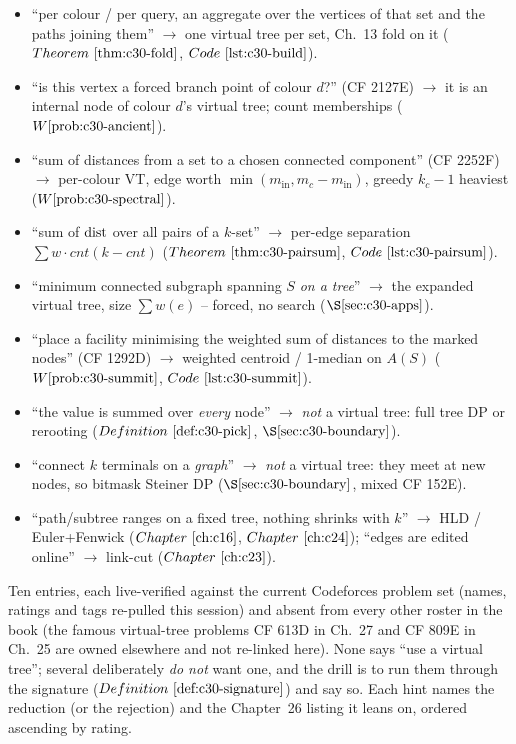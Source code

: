 \begin{itemize}[nosep, leftmargin=1.4em]
  \item ``per colour / per query, an aggregate over the vertices of that set and the paths joining them''
        \(\to\) one virtual tree per set, Ch.~13 fold on it (\(\thmref{c30-fold}\), \(\coderef{c30-build}\)).
  \item ``is this vertex a forced branch point of colour \(d\)?'' (CF 2127E) \(\to\) it is an internal node
        of colour \(d\)'s virtual tree; count memberships (\(\probref{c30-ancient}\)).
  \item ``sum of distances from a set to a chosen connected component'' (CF 2252F) \(\to\) per-colour VT,
        edge worth \(\min(m_{\text{in}},m_c-m_{\text{in}})\), greedy \(k_c-1\) heaviest (\(\probref{c30-spectral}\)).
  \item ``sum of \(\operatorname{dist}\) over all pairs of a \(k\)-set'' \(\to\) per-edge separation \(\sum w\cdot\mathit{cnt}(k-\mathit{cnt})\)
        (\(\thmref{c30-pairsum}\), \(\coderef{c30-pairsum}\)).
  \item ``minimum connected subgraph spanning \(S\) \emph{on a tree}'' \(\to\) the expanded virtual tree,
        size \(\sum\mathit{w}(e)\) -- forced, no search (\(\secref{c30-apps}\)).
  \item ``place a facility minimising the weighted sum of distances to the marked nodes'' (CF 1292D)
        \(\to\) weighted centroid / 1-median on \(A(S)\) (\(\probref{c30-summit}\), \(\coderef{c30-summit}\)).
  \item ``the value is summed over \emph{every} node'' \(\to\) \emph{not} a virtual tree: full tree DP
        or rerooting (\(\defref{c30-pick}\), \(\secref{c30-boundary}\)).
  \item ``connect \(k\) terminals on a \emph{graph}'' \(\to\) \emph{not} a virtual tree: they meet
        at new nodes, so bitmask Steiner DP (\(\secref{c30-boundary}\), mixed CF 152E).
  \item ``path/subtree ranges on a fixed tree, nothing shrinks with \(k\)'' \(\to\) HLD / Euler+Fenwick
        (\(\chref{c16}\), \(\chref{c24}\)); ``edges are edited online'' \(\to\) link-cut (\(\chref{c23}\)).
\end{itemize}


Ten entries, each live-verified against the current Codeforces problem set (names, ratings and tags
re-pulled this session) and absent from every other roster in the book (the famous virtual-tree problems
CF 613D in Ch.~27 and CF 809E in Ch.~25 are owned elsewhere and not re-linked here). None says ``use a
virtual tree''; several deliberately \emph{do not} want one, and the drill is to run them through the
signature (\(\defref{c30-signature}\)) and say so. Each hint names the reduction (or the rejection) and
the Chapter~26 listing it leans on, ordered ascending by rating.

